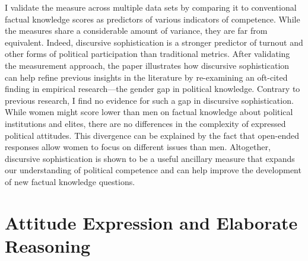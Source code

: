 I validate the measure across multiple data sets by comparing it to conventional factual knowledge scores as predictors of various indicators of competence. While the measures share a considerable amount of variance, they are far from equivalent. Indeed, discursive sophistication is a stronger predictor of turnout and other forms of political participation than traditional metrics. After validating the measurement approach, the paper illustrates how discursive sophistication can help refine previous insights in the literature by re-examining an oft-cited finding in empirical research---the gender gap in political knowledge. Contrary to previous research, I find no evidence for such a gap in discursive sophistication. While women might score lower than men on factual knowledge about political institutions and elites, there are no differences in the complexity of expressed political attitudes. This divergence can be explained by the fact that open-ended responses allow women to focus on different issues than men. Altogether, discursive sophistication is shown to be a useful ancillary measure that expands our understanding of political competence and can help improve the development of new factual knowledge questions.



\section*{Attitude Expression and Elaborate Reasoning}



